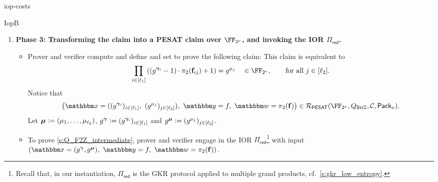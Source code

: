 \begin{lncsappendix}{iop-costs}
\begin{lncsmove}{IopB}
\begin{construction}
\begin{enumerate}[leftmargin=*]
\begin{itemize}[leftmargin=*]
%
\iflncs\else\end{itemize}\fi
\item \textbf{Phase 3: Transforming the claim into a PESAT claim over {$\comfield$}, and invoking the IOR {$\Pi_{\mathsf{red}}$}.}
\iflncs\else\begin{itemize}[leftmargin=*]\fi
\iflncs\else\item \fi
Prover and verifier compute and define 
%
and set to prove the following claim:
%
This claim is equivalent to
\begin{equation}\label{e:exponent_tensored_equality}
\prod_{i \in [\codedim_1]} \left(\left(g^{\bm{\gamma}_i}-1\right)\cdot \pi_2(\bff_{ij}) +1\right)= g^{\mu_j}  \quad  \in \comfield, \qquad \text{for all } j\in [\codedim_2].
\end{equation}
Notice that \iflncs\begingroup\small\fi\begin{equation}\label{e:Q_F2Z_intermediate}\left(\inp=((g^{\bm{\gamma}_i})_{i \in [\codedim_1]},\ (g^{\mu_j})_{j\in [\codedim_2]}),\  \oracle= f, \ \wit=\picomfield(\bff)\right)\in \PESAT(\comfield, Q_{\mathbb{B}\text{it}\ZZ},\cC, \pack).
\end{equation}
\iflncs\endgroup\fi
Let  $\bm{\mu}{\;\vcentcolon=\;} (\mu_1,\ldots, \mu_{\ell_2})$, $g^{\bm{\gamma}}{\;\vcentcolon=\;} (g^{\bm{\gamma}_i})_{i \in [\ell_1]}$ and $g^{\bm{\mu}}{\;\vcentcolon=\;} (g^{\mu_j})_{j\in [\ell_2]}$.
\iflncs\else\item\fi{} To prove \eqref{e:Q_F2Z_intermediate}, prover and verifier engage in the IOR $\Pi_{\mathsf{red}}$\footnote{Recall that, in our instantiation, $\Pi_{\mathsf{red}}$ is the GKR protocol applied to multiple grand products, cf.\ \cref{s:gkr_low_entropy}.}   with input \iflncs$(\inp=(g^{\bm{\gamma}}, g^{\bm{\mu}}),\allowbreak\ \oracle= f,\allowbreak\ \wit=\picomfield(\bff))$.\else{}\fi
%
%


\end{itemize}
\end{enumerate}
\end{construction}
\end{lncsmove}
\end{lncsappendix}
